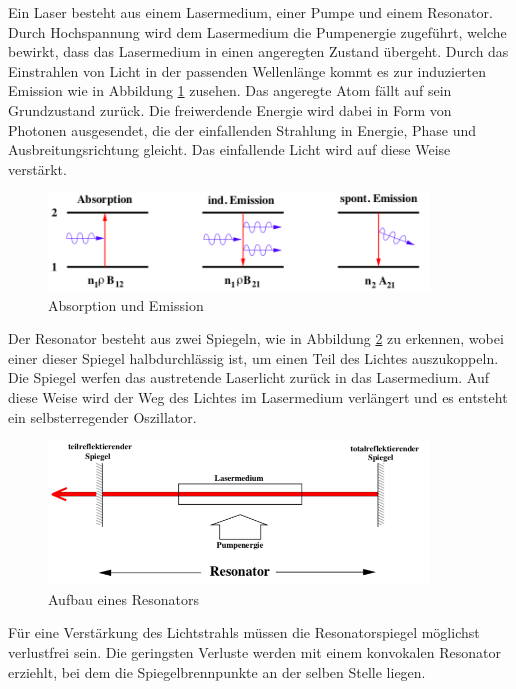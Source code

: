 Ein Laser besteht aus einem Lasermedium, einer Pumpe und einem Resonator.
Durch Hochspannung wird dem Lasermedium die Pumpenergie zugeführt, welche bewirkt, dass das Lasermedium in einen angeregten Zustand übergeht.
Durch das Einstrahlen von Licht in der passenden Wellenlänge kommt es zur induzierten Emission wie in Abbildung \ref{fig:absemi} zusehen.
Das angeregte Atom fällt auf sein Grundzustand zurück.
Die freiwerdende Energie wird dabei in Form von Photonen ausgesendet, die der einfallenden Strahlung in Energie, Phase und Ausbreitungsrichtung gleicht.
Das einfallende Licht wird auf diese Weise verstärkt.\\
\begin{figure}[h!]
  \centering
  \includegraphics[width=0.9\textwidth]{absorption.PNG}
  \caption{Absorption und Emission \cite{1}}
  \label{fig:absemi}
\end{figure}
\FloatBarrier
Der Resonator besteht aus zwei Spiegeln, wie in Abbildung \ref{fig:resonator} zu erkennen, wobei einer dieser Spiegel halbdurchlässig ist, um einen Teil des Lichtes auszukoppeln.
Die Spiegel werfen das austretende Laserlicht zurück in das Lasermedium.
Auf diese Weise wird der Weg des Lichtes im Lasermedium verlängert und es entsteht ein selbsterregender Oszillator.
\begin{figure}[h!]
  \centering
  \includegraphics[width=0.9\textwidth]{resonator.PNG}
  \caption{Aufbau eines Resonators \cite{1}}
  \label{fig:resonator}
\end{figure}
\FloatBarrier
Für eine Verstärkung des Lichtstrahls müssen die Resonatorspiegel möglichst verlustfrei sein.
Die geringsten Verluste werden mit einem konvokalen Resonator erziehlt, bei dem die Spiegelbrennpunkte an der selben Stelle liegen.
